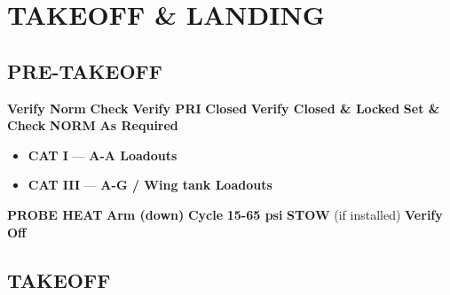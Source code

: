 \marginfigeometry

\section{TAKEOFF \& LANDING}

\subsection{PRE-TAKEOFF}
\begin{checklistenumerate}
    \dotfill\textbf{Verify Norm}
    \blueitem[Trim]\dotfill\textbf{Check}
    \dotfill\textbf{Verify PRI}
    \blueitem[Speedbrakes]\dotfill\textbf{Closed}
    \blueitem[Canopy]\dotfill\textbf{Verify Closed \& Locked}
    \blueitem[IFF]\dotfill\textbf{Set \& Check}
    \dotfill\textbf{NORM}
    \dotfill\textbf{As Required}
    
    \begin{itemize}
        \item \textbf{CAT I} --- \textbf{A-A Loadouts} 
        \item \textbf{CAT III} --- \textbf{A-G / Wing tank Loadouts}
    \end{itemize}
    \dotfill\textbf{PROBE HEAT}
    \cbstart\dotfill\textbf{Arm (down)}\cbend
    \dotfill\textbf{Cycle}
    \dotfill\textbf{15-65 psi}
    \blueitem[TGP]\dotfill\textbf{STOW} (if installed)
    \dotfill\textbf{Verify Off}
\end{checklistenumerate}

\subsection{TAKEOFF}

